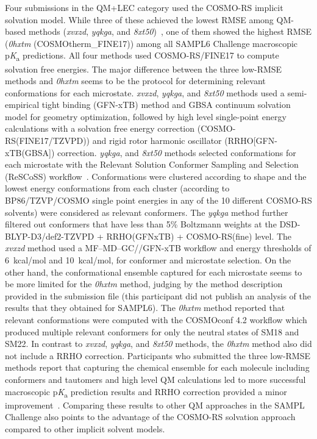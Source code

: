 \documentclass[9pt,lineno,final]{elife}
\newcommand{\pKa}{p\textit{K}\textsubscript{a}}
\begin{document}
Four submissions in the QM+LEC category used the COSMO-RS implicit solvation model. 
While three of these achieved the lowest RMSE among QM-based methods (\textit{xvxzd}, \textit{yqkga}, and \textit{8xt50})~\citep{Pracht:2018:J.Comput.AidedMol.Des.}, one of them showed the highest RMSE (\textit{0hxtm} (COSMOtherm\_FINE17)) among all SAMPL6 Challenge macroscopic \pKa{} predictions. 
All four methods used COSMO-RS/FINE17 to compute solvation free energies. 
The major difference between the three low-RMSE methods and \textit{0hxtm} seems to be the protocol for determining relevant conformations for each microstate. 
\textit{xvxzd}, \textit{yqkga}, and \textit{8xt50} methods used a semi-empirical tight binding (GFN-xTB) method and GBSA continuum solvation model for geometry optimization, followed by high level single-point energy calculations with a solvation free energy correction (COSMO-RS(FINE17/TZVPD)) and rigid rotor harmonic oscillator (RRHO[GFN-xTB(GBSA]) correction. 
\textit{yqkga}, and \textit{8xt50} methods selected  conformations for each microstate with the Relevant Solution Conformer Sampling and Selection (ReSCoSS) workflow~\citep{Pracht:2018:J.Comput.AidedMol.Des.}. 
Conformations were clustered according to shape and the lowest energy conformations from each cluster (according to BP86/TZVP/COSMO single point energies in any of the 10 different COSMO-RS solvents) were considered as relevant conformers. 
The \textit{yqkga} method further filtered out conformers that have less than 5\% Boltzmann weights at the DSD-BLYP-D3/def2-TZVPD + RRHO(GFNxTB) + COSMO-RS(fine) level.
The \textit{xvxzd} method used a MF–MD–GC//GFN-xTB workflow and energy thresholds of 6~kcal/mol and 10~kcal/mol, for conformer and microstate selection.
On the other hand, the conformational ensemble captured for each microstate seems to be more limited for the \textit{0hxtm} method, judging by the method description provided in the submission file (this participant did not publish an analysis of the results that they obtained for SAMPL6). 
The \textit{0hxtm} method reported that relevant conformations were computed with the COSMOconf 4.2 workflow which produced multiple relevant conformers for only the neutral states of SM18 and SM22.  
In contrast to \textit{xvxzd}, \textit{yqkga}, and \textit{8xt50} methods, the \textit{0hxtm} method also did not include a RRHO correction.
Participants who submitted the three low-RMSE methods report that capturing the chemical ensemble for each molecule including conformers and tautomers and high level QM calculations led to more successful macroscopic \pKa{} prediction results and RRHO correction provided a minor improvement~\citep{Pracht:2018:J.Comput.AidedMol.Des.}. 
Comparing these results to other QM approaches in the SAMPL Challenge also points to the advantage of the COSMO-RS solvation approach compared to other implicit solvent models.
\end{document}
